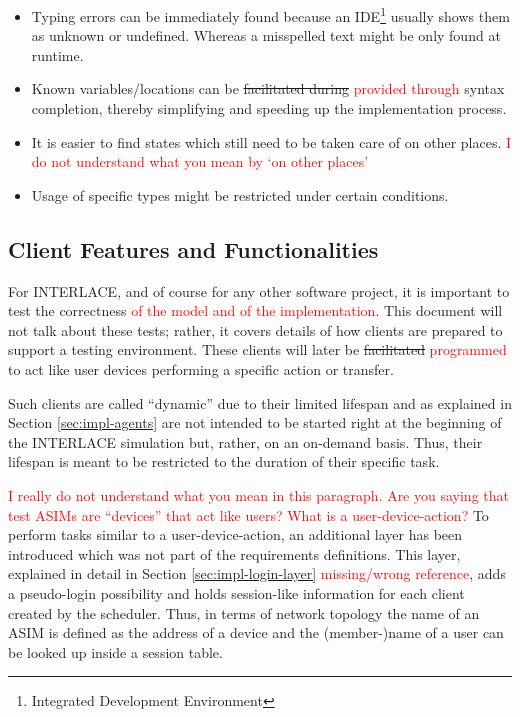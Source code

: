 \begin{itemize}
	\item Typing errors can be immediately found because an IDE\footnote{Integrated Development Environment} usually shows them as unknown or undefined. Whereas a misspelled text might be only found at runtime.
	\item Known variables/locations can be \st{facilitated during} \textcolor{red}{provided through} syntax completion, thereby simplifying and speeding up the implementation process.
	\item It is easier to find states which still need to be taken care of on other places. \textcolor{red}{I do not understand what you mean by `on other places'}
	\item Usage of specific types might be restricted under certain conditions.
\end{itemize}

\subsection{Client Features and Functionalities}
\label{subsec:impl-client-features}

For INTERLACE, and of course for any other software project, it is important to test the correctness \textcolor{red}{of the model and of the implementation}. This document will not talk about these tests; rather, it covers details of how clients are prepared to support a testing environment. These clients will later be \st{facilitated} \textcolor{red}{programmed} to act like user devices performing a specific action or transfer.

Such clients are called ``dynamic'' due to their limited lifespan and as explained in Section \ref{sec:impl-agents} are not intended to be started right at the beginning of the INTERLACE simulation but, rather, on an on-demand basis. Thus, their lifespan is meant to be restricted to the duration of their specific task.

\textcolor{red}{I really do not understand what you mean in this paragraph. Are you saying that test ASIMs are ``devices'' that act like users? What is a user-device-action?}
To perform tasks similar to a user-device-action, an additional layer has been introduced which was not part of the requirements definitions. This layer, explained in detail in Section \ref{sec:impl-login-layer} \textcolor{red}{missing/wrong reference}, adds a pseudo-login possibility and holds session-like information for each client created by the scheduler. Thus, in terms of network topology the name of an ASIM is defined as the address of a device and the (member-)name of a user can be looked up inside a session table.

